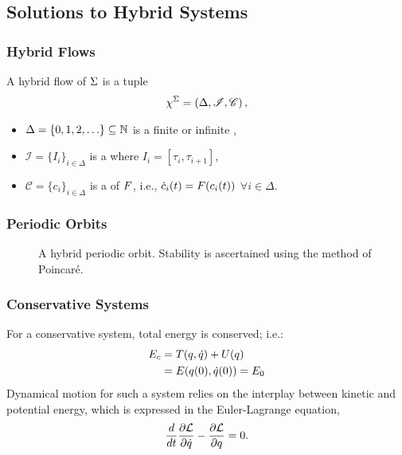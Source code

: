 \subsection{Solutions to Hybrid Systems}
\begin{frame}[t]
  \frametitle{Hybrid Flows}
  A \alert{hybrid flow} of $\Sigma$ is a tuple
  \begin{align*}
    \chi^{\Sigma} = \left( \Delta, \mathscr{I}, \mathscr{C} \right),
  \end{align*}
  \vspace{-2em}
  \begin{itemize}
  \item $\Delta = \{0, 1, 2, \ldots\} \subseteq \mathbb{N}$ is a finite or infinite ,
  \item $\mathscr{I} = \{I_{i} \}_{i \in \Delta}$ is a  where $I_{i} = [\tau_{i}, \tau_{i + 1}]$,
  \item $\mathscr{C} = \{c_{i} \}_{i \in \Delta}$ is a  of $F$, i.e., ${\dot c}_{i}(t) = F(c_{i}(t))$ $\forall i \in \Delta$.
  \end{itemize}


\end{frame}


\begin{frame}[t]
  \frametitle{Periodic Orbits}
  \begin{figure}    
    \centering
    \def\svgwidth{.45\columnwidth}
    
    \caption{A hybrid periodic orbit. Stability is ascertained using the method of Poincar\'e.}
  \end{figure}
\end{frame}

\begin{frame}[t]
  \frametitle{Conservative Systems}
  For a conservative system, total energy is conserved; i.e.:
  \begin{align*}
    E_{c} &= T(q, \dot q) + U(q)\\
    &= E(q(0), \dot q(0)) = E_{0}
  \end{align*}
  Dynamical motion for such a system relies on the interplay between kinetic and potential energy, which is expressed in the Euler-Lagrange equation,
  \begin{align*}
    \frac{d}{dt} \frac{\partial{\ensuremath{\mathcal{L}}}}{\partial{\ensuremath{\dot q}}} - \frac{\partial{\ensuremath{\mathcal{L}}}}{\partial{\ensuremath{q}}} = 0.
  \end{align*}
\end{frame}


